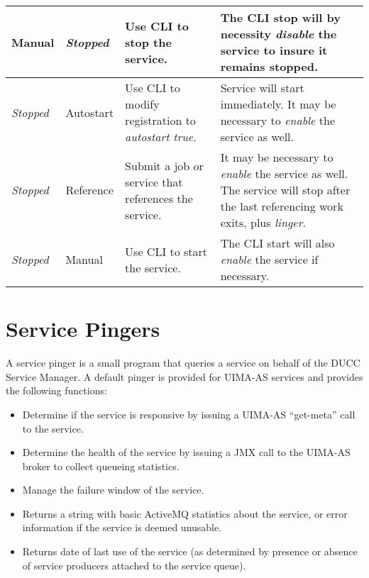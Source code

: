 \begin{tabular}{| l | l | p{6cm} | p{6cm} |}
        \hline
        Manual      & {\em Stopped} & Use CLI to stop the service. & The CLI stop will by necessity {\em disable} the service to insure it remains stopped. \\
        \hline
        {\em Stopped} & Autostart    & Use CLI to modify registration to {\em autostart true}. & Service will start immediately. It may be necessary to {\em enable} the service as well.\\
        \hline
        {\em Stopped} & Reference    & Submit a job or service that references the service. & It may be necessary to {\em enable} the service as well. 
                                       The service will stop after the last referencing work exits, plus {\em linger}.  \\
        \hline
        {\em Stopped} & Manual       & Use CLI to start the service. &  The CLI start will also {\em enable} the service if necessary. \\
        \hline
      \end{tabular}
      
      \section{Service Pingers}
      \label{sec:service.pingers}
      A service pinger is a small program that queries a service on behalf of the DUCC Service
      Manager.  A default pinger is provided for UIMA-AS services and provides the following
      functions:
      \begin{itemize}
        \item Determine if the service is responsive by issuing a UIMA-AS ``get-meta'' call 
          to the service.
        \item Determine the health of the service by issuing a JMX call to the UIMA-AS broker
          to collect queueing statistics.
        \item Manage the failure window of the service.
        \item Returns a string with basic ActiveMQ statistics about the service, or
          error information if the service is deemed unusable.
        \item Returns date of last use of the service (as determined by presence or
          absence of service producers attached to the service queue).
      \end{itemize}

